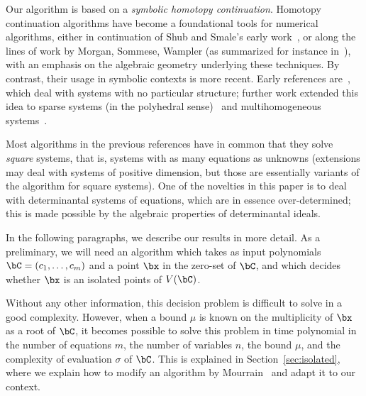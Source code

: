 \documentclass[12pt]{article}
\begin{document}

Our algorithm is based on a {\em symbolic homotopy continuation}.
Homotopy continuation algorithms have become a foundational tools for
numerical algorithms, either in continuation of Shub and Smale's early
work~\cite{ShSm93}, or along the lines of work by Morgan, Sommese,
Wampler (as summarized for instance in~\cite{SoWa05}), with an emphasis
on the algebraic geometry underlying these techniques. By contrast,
their usage in symbolic contexts is more recent. Early references
are~\cite{HeKrPuSaWa99,BoMaWaWa04}, which deal with systems with no
particular structure; further work extended this idea to sparse
systems (in the polyhedral sense)~\cite{JeMaSoWa09,HeJeSa10,HeJeSa13,HeJeSa14}
and multihomogeneous systems~\cite{HeJeSaSo02,SaSc16}.

Most algorithms in the previous references have in common that they
solve {\em square} systems, that is, systems with as many equations as
unknowns (extensions may deal with systems of positive dimension, but
those are essentially variants of the algorithm for square systems).
One of the novelties in this paper is to deal with determinantal
systems of equations, which are in essence over-determined; this is
made possible by the algebraic properties of determinantal ideals.

In the following paragraphs, we describe our results in more detail.
As a preliminary, we will need an algorithm which takes as input
polynomials $\bC=(c_1,\dots,c_m)$ and a point $\bx$ in the zero-set of
$\bC$, and which decides whether $\bx$ is an isolated points
of $V(\bC)$.

Without any other information, this decision problem is difficult to
solve in a good complexity. However, when a bound $\mu$ is known on
the multiplicity of $\bx$ as a root of $\bC$, it becomes possible to
solve this problem in time polynomial in the number of equations $m$,
the number of variables $n$, the bound $\mu$, and the complexity of
evaluation $\sigma$ of $\bC$. This is explained in
Section~\ref{sec:isolated}, where we explain how to modify an algorithm
by Mourrain~\cite{Mourrain97} and adapt it to our context.
\end{document}
